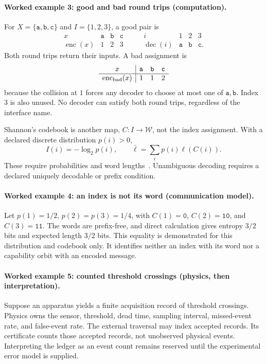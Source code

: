\paragraph{Worked example 3: good and bad round trips (computation).}
For \(X=\{\mathtt a,\mathtt b,\mathtt c\}\) and \(I=\{1,2,3\}\), a good pair is
\[
\begin{array}{c|ccc}
x&\mathtt a&\mathtt b&\mathtt c\\ \hline
\operatorname{enc}(x)&1&2&3
\end{array}
\qquad
\begin{array}{c|ccc}
i&1&2&3\\ \hline
\operatorname{dec}(i)&\mathtt a&\mathtt b&\mathtt c .
\end{array}
\]
Both round trips return their inputs.  A bad assignment is
\[
\begin{array}{c|ccc}
x&\mathtt a&\mathtt b&\mathtt c\\ \hline
\operatorname{enc}_{\rm bad}(x)&1&1&2
\end{array}
\]
because the collision at \(1\) forces any decoder to choose at most one of \(\mathtt a,\mathtt b\).  Index \(3\) is
also unused.  No decoder can satisfy both round trips, regardless of the interface name.

Shannon's codebook is another map, \(C:I\to\mathcal W\), not the index assignment.  With a declared discrete
distribution \(p(i)>0\),
\[
 I(i)=-\log_2p(i),\qquad
 \bar\ell=\sum_i p(i)\ell(C(i)).
\]
These require probabilities and word lengths~\cite{shannon1948}.  Unambiguous decoding requires a declared uniquely
decodable or prefix condition.

\paragraph{Worked example 4: an index is not its word (communication model).}
Let \(p(1)=1/2\), \(p(2)=p(3)=1/4\), with
\(C(1)=\mathtt0\), \(C(2)=\mathtt{10}\), and \(C(3)=\mathtt{11}\).  The words are prefix-free, and direct calculation
gives entropy \(3/2\) bits and expected length \(3/2\) bits.  This equality is demonstrated for this distribution and
codebook only.  It identifies neither an index with its word nor a capability orbit with an encoded message.

\paragraph{Worked example 5: counted threshold crossings (physics, then interpretation).}
Suppose an apparatus yields a finite acquisition record of threshold crossings.  Physics owns the sensor, threshold,
dead time, sampling interval, missed-event rate, and false-event rate.  The external traversal may index accepted
records.  Its certificate counts those accepted records, not unobserved physical events.  Interpreting the ledger as an
event count remains reserved until the experimental error model is supplied.

